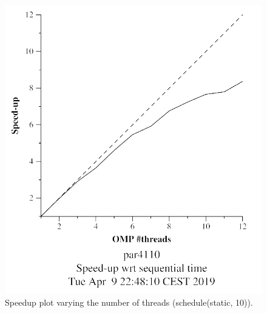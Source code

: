 \documentclass[12pt, a4paper]{article}
\begin{document}
\begin{figure}[H]
\begin{minipage}[b]{0.4\linewidth}
  \includegraphics[scale=0.5]{./mandel-omp-10000-strong-omp-for-static-800-speedup}
  \caption{Speedup plot varying the number of threads (schedule(static, 10)).}
  \label{fig:mandel-omp-10000-strong-omp-for-static-800-speedup}
\end{minipage}
\end{figure}
\end{document}
